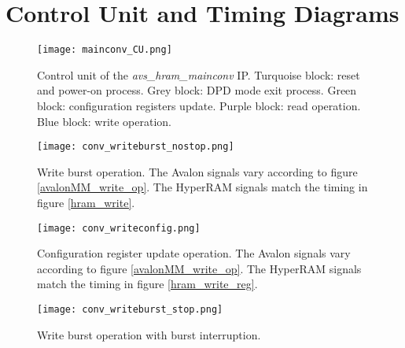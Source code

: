 \documentclass[10pt, english, a4paper, titlepage, oneside]{book}
\begin{document}
\section{Control Unit and Timing Diagrams} \label{CU}
\begin{figure}[H]
    \centering
    \captionsetup{width=14cm}
    \texttt{[image: mainconv\_CU.png]}
    \caption{\centering Control unit of the \textit{avs\_hram\_mainconv} IP. Turquoise block: reset and power-on process. Grey block: DPD mode exit process. Green block: configuration registers update. Purple block: read operation. Blue block: write operation.}
    \label{mainconv_CU}
\end{figure}
\vspace{4mm}
\begin{figure}[H]
    \centering
    \captionsetup{width=11cm}
    \texttt{[image: conv\_writeburst\_nostop.png]}
    \caption{\centering Write burst operation. The Avalon signals vary according to figure \ref{avalonMM_write_op}. The HyperRAM signals match the timing in figure \ref{hram_write}.}
    \label{conv_writeburst_nostop}
\end{figure}
\begin{figure}[H]
    \centering
    \captionsetup{width=13cm}
    \texttt{[image: conv\_writeconfig.png]}
    \caption{\centering Configuration register update operation. The Avalon signals vary according to figure \ref{avalonMM_write_op}. The HyperRAM signals match the timing in figure \ref{hram_write_reg}.}
    \label{conv_writeconfig}
\end{figure}
\begin{figure}[H]
    \centering
    \captionsetup{width=16cm}
    \texttt{[image: conv\_writeburst\_stop.png]}
    \caption{\centering Write burst operation with burst interruption.}
    \label{conv_writeburst_stop}
\end{figure}
\vspace{6mm}
\end{document}
